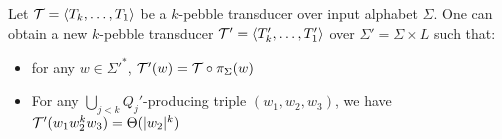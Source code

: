 \begin{lemma}
Let ${\mathcal T}=\langle T_k,\ldots,T_1 \rangle$ be a $k$-pebble transducer over input alphabet $\Sigma$.
One can obtain a new $k$-pebble transducer ${\mathcal T}'=\langle T_k',\ldots,T_1' \rangle$ over $\Sigma'=\Sigma\times L $ such that:
\begin{itemize}
\item for any $w\in \Sigma'^*$, ${\mathcal T}'(w)={\mathcal T}\circ\pi_{\Sigma}(w)$
\item For any $\bigcup_{j<k} Q_j'$-producing triple $(w_1,w_2,w_3)$, we have ${\mathcal T}'(w_1w_2^kw_3)=\Theta(|w_2|^k)$
\end{itemize}

\end{lemma}